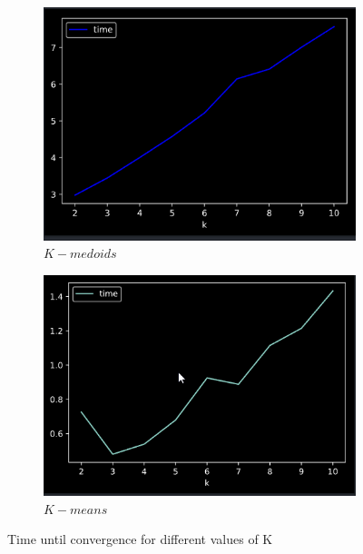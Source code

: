 \documentclass[a4paper]{article}
\begin{document}
 	\begin{figure}[h]
		
    \centering
    \begin{subfigure}[b]{0.3\textwidth}
        \includegraphics[width=\textwidth]{kmedoids_time.png}
        \caption{$K-medoids$}
        \label{fig:k_medoids_time}
    \end{subfigure}
    \begin{subfigure}[b]{0.3\textwidth}
        \includegraphics[width=\textwidth]{kmeans_time.png}
        \caption{$K-means$}
        \label{fig:k_means_time}
    \end{subfigure}
    \caption{Time until convergence for different values of K}\label{fig2}
\end{figure}
\end{document}

